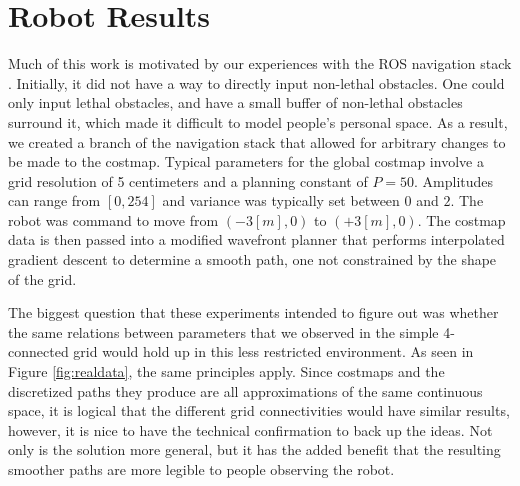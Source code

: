 \section{Robot Results}
Much of this work is motivated by our experiences with the ROS navigation stack \cite{marder:office}. Initially, it did not have a way to directly input non-lethal obstacles. One could only input lethal obstacles, and have a small buffer of non-lethal obstacles surround it, which made it difficult to model people's personal space. As a result, we created a branch of the navigation stack that allowed for arbitrary changes to be made to the costmap. Typical parameters for the global costmap involve a grid resolution of 5 centimeters and a planning constant of $P=50$. Amplitudes can range from $[0, 254]$ and variance was typically set between $0$ and $2$. The robot was command to move from $(-3[m], 0)$ to $(+3[m], 0)$. The costmap data is then passed into a modified wavefront planner that performs interpolated gradient descent to determine a smooth path, one not constrained by the shape of the grid. 

The biggest question that these experiments intended to figure out was whether the same relations between parameters that we observed in the simple 4-connected grid would hold up in this less restricted environment. As seen in Figure \ref{fig:realdata}, the same principles apply. Since costmaps and the discretized paths they produce are all approximations of the same continuous space, it is logical that the different grid connectivities would have similar results, however, it is nice to have the technical confirmation to back up the ideas. Not only is the solution more general, but it has the added benefit that the resulting smoother paths are more legible to people observing the robot. 


